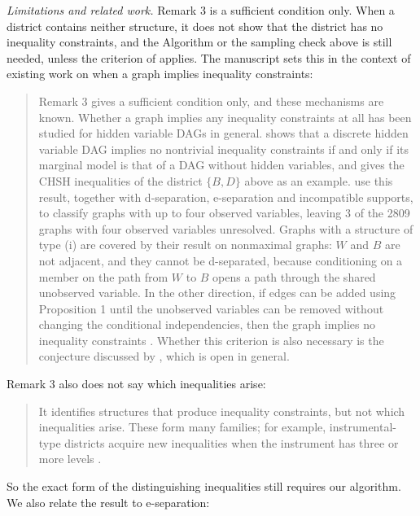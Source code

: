 \documentclass{article}
\begin{document}
\begin{enumerate}
\begin{mdframed}
\emph{Limitations and related work.} Remark 3 is a sufficient condition only. When a district contains neither structure, it does not show that the district has no inequality constraints, and the Algorithm or the sampling check above is still needed, unless the criterion of \citet{henson2014theory} applies. The manuscript sets this in the context of existing work on when a graph implies inequality constraints:
\begin{quote}
Remark 3 gives a sufficient condition only, and these mechanisms are known. Whether a graph implies any inequality constraints at all has been studied for hidden variable DAGs in general. \citet{evans2023latent} shows that a discrete hidden variable DAG implies no nontrivial inequality constraints if and only if its marginal model is that of a DAG without hidden variables, and gives the CHSH inequalities of the district $\{B, D\}$ above as an example. \citet{khanna2024classifying} use this result, together with d-separation, e-separation and incompatible supports, to classify graphs with up to four observed variables, leaving 3 of the 2809 graphs with four observed variables unresolved. Graphs with a structure of type (i) are covered by their result on nonmaximal graphs: $W$ and $B$ are not adjacent, and they cannot be d-separated, because conditioning on a member on the path from $W$ to $B$ opens a path through the shared unobserved variable. In the other direction, if edges can be added using Proposition 1 until the unobserved variables can be removed without changing the conditional independencies, then the graph implies no inequality constraints \citep{henson2014theory}. Whether this criterion is also necessary is the conjecture discussed by \citet{khanna2024classifying}, which is open in general.
\end{quote}
Remark 3 also does not say which inequalities arise:
\begin{quote}
It identifies structures that produce inequality constraints, but not which inequalities arise. These form many families; for example, instrumental-type districts acquire new inequalities when the instrument has three or more levels \citep{bonet2001instrumentality}.
\end{quote}
So the exact form of the distinguishing inequalities still requires our algorithm. We also relate the result to e-separation:
\begin{quote}

\end{quote}
\end{mdframed}
\end{enumerate}
\end{document}
